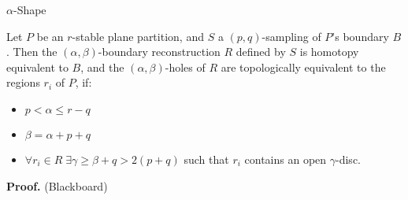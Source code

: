     \begin{frame}{$\alpha$-Shape}
        \begin{theorem}
            Let $P$ be an $r$-stable plane partition, and $S$ a $\left(p,q\right)$-sampling of $P$’s boundary $B$. Then the $\left(\alpha,\beta\right)$-boundary reconstruction $R$ defined by $S$ is homotopy equivalent to $B$, and the $\left(\alpha,\beta\right)$-holes of $R$ are topologically equivalent to the regions $r_i$ of $P$, if:
            \begin{itemize}
                \item $p < \alpha \leq r - q$
                \item $\beta = \alpha + p + q$
                \item $\forall r_i \in R \;\exists \gamma \geq \beta + q > 2\left(p+q\right)$ such that $r_i$ contains an open $\gamma$-disc.
            \end{itemize}
            \textbf{Proof.} (Blackboard)
        \end{theorem}
    \end{frame}
